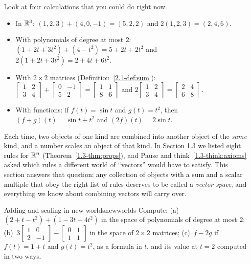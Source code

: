 \documentclass[11pt]{article}
\begin{document}
Look at four calculations that you could do right now.
\begin{itemize}
  \item In $\mathbb{R}^3$: $(1,2,3)+(4,0,-1)=(5,2,2)$ and $2(1,2,3)=(2,4,6)$.
  \item With polynomials of degree at most $2$: $(1+2t+3t^2)+(4-t^2)=5+2t+2t^2$ and $2(1+2t+3t^2)=2+4t+6t^2$.
  \item With $2\times2$ matrices (Definition~\ref{2.1-def:sum}): $\begin{bmatrix}1&2\\3&4\end{bmatrix}+\begin{bmatrix}0&-1\\5&2\end{bmatrix}=\begin{bmatrix}1&1\\8&6\end{bmatrix}$ and $2\begin{bmatrix}1&2\\3&4\end{bmatrix}=\begin{bmatrix}2&4\\6&8\end{bmatrix}$.
  \item With functions: if $f(t)=\sin t$ and $g(t)=t^2$, then $(f+g)(t)=\sin t+t^2$ and $(2f)(t)=2\sin t$.
\end{itemize}
Each time, two objects of one kind are combined into another object of the \emph{same} kind, and a number scales an object of that kind. In Section 1.3 we listed eight rules for $\mathbb{R}^n$ (Theorem~\ref{1.3-thm:props}), and Pause and think~\ref{1.3-think:axioms} asked which rules a different world of ``vectors'' would have to satisfy. This section answers that question: any collection of objects with a sum and a scalar multiple that obey the right list of rules deserves to be called a \emph{vector space}, and everything we know about combining vectors will carry over.

\begin{kc}{Adding and scaling in new worlds}{newworlds}
Compute: (a)~$(2+t-t^2)+(1-3t+4t^2)$ in the space of polynomials of degree at most $2$; (b)~$3\begin{bmatrix}1&0\\2&-1\end{bmatrix}-\begin{bmatrix}0&1\\1&1\end{bmatrix}$ in the space of $2\times2$ matrices; (c)~$f-2g$ if $f(t)=1+t$ and $g(t)=t^2$, as a formula in $t$, and its value at $t=2$ computed in two ways.
\end{kc}
\end{document}
